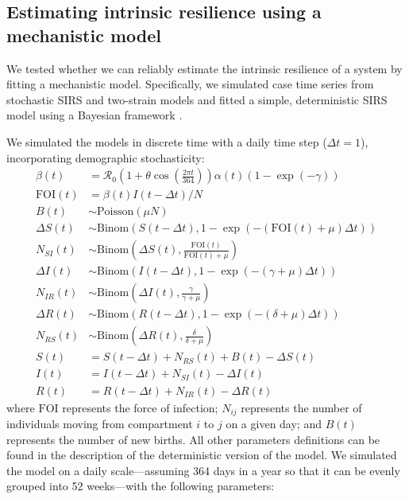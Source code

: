\documentclass[12pt]{article}
\begin{document}
\subsection*{Estimating intrinsic resilience using a mechanistic model}

We tested whether we can reliably estimate the intrinsic resilience of a system by fitting a mechanistic model.
Specifically, we simulated case time series from stochastic SIRS and two-strain models and fitted a simple, deterministic SIRS model using a Bayesian framework \citep{park2024predicting,nielsen2025complex,park2025interplay}.

We simulated the models in discrete time with a daily time step ($\Delta t = 1$), incorporating demographic stochasticity:
\begin{align}
\beta(t) &= \mathcal R_0 \left(1 + \theta \cos\left(\frac{2 \pi t}{364}\right)\right) \alpha(t)  (1-\exp(-\gamma))\\
\textrm{FOI}(t) &= \beta(t) I(t- \Delta t)/N\\
B(t) &\sim \mathrm{Poisson}(\mu N)\\
\Delta S(t) &\sim \mathrm{Binom}\left(S(t-\Delta t), 1- \exp(-(\textrm{FOI}(t) + \mu) \Delta t )\right) \\
N_{SI}(t) &\sim \mathrm{Binom}\left(\Delta S(t), \frac{\textrm{FOI}(t)}{\textrm{FOI}(t) + \mu} \right)\\
\Delta I(t) &\sim \mathrm{Binom}\left(I(t-\Delta t), 1- \exp(-(\gamma + \mu) \Delta t )\right) \\
N_{IR}(t) &\sim \mathrm{Binom}\left(\Delta I(t), \frac{\gamma}{\gamma + \mu} \right)\\
\Delta R(t) &\sim \mathrm{Binom}\left(R(t-\Delta t), 1- \exp(-(\delta+ \mu) \Delta t )\right) \\
N_{RS}(t) &\sim \mathrm{Binom}\left(\Delta R(t), \frac{\delta}{\delta + \mu} \right)\\
S(t) &= S(t-\Delta t) + N_{RS}(t) + B(t) - \Delta S(t)\\
I(t) &= I(t-\Delta t) + N_{SI}(t) - \Delta I(t)\\
R(t) &= R(t-\Delta t) + N_{IR}(t) - \Delta R(t)
\end{align}
where $\textrm{FOI}$ represents the force of infection;
$N_{ij}$ represents the number of individuals moving from compartment $i$ to $j$ on a given day; 
and $B(t)$ represents the number of new births.
All other parameters definitions can be found in the description of the deterministic version of the model.
We simulated the model on a daily scale---assuming 364 days in a year so that it can be evenly grouped into 52 weeks---with the following parameters:
\end{document}
